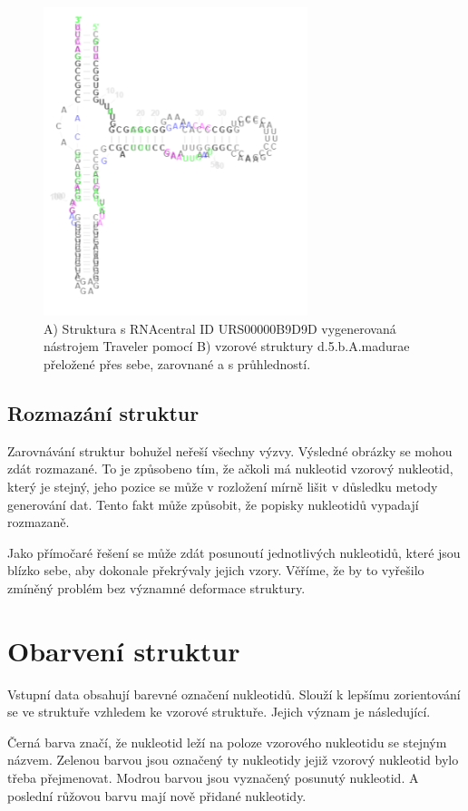 \begin{figure}[H]
  \centering
  \includegraphics[height=90mm]{../img/kap02/align/aligned.png}
  \caption{A) Struktura s RNAcentral ID URS00000B9D9D vygenerovaná nástrojem
  Traveler pomocí B) vzorové struktury d.5.b.A.madurae přeložené přes sebe,
  zarovnané a s průhledností.}
\end{figure}

\subsection{Rozmazání struktur}

Zarovnávání struktur bohužel neřeší všechny výzvy. Výsledné obrázky se mohou
zdát rozmazané. To je způsobeno tím, že ačkoli má nukleotid vzorový nukleotid,
který je stejný, jeho pozice se může v rozložení mírně lišit v důsledku metody
generování dat. Tento fakt může způsobit, že popisky nukleotidů vypadají
rozmazaně.

Jako přímočaré řešení se může zdát posunoutí jednotlivých nukleotidů, které jsou
blízko sebe, aby dokonale překrývaly jejich vzory. Věříme, že by to vyřešilo
zmíněný problém bez významné deformace struktury.

\section{Obarvení struktur}

Vstupní data obsahují barevné označení nukleotidů. Slouží k lepšímu
zorientování se ve struktuře vzhledem ke vzorové struktuře. Jejich význam je
následující.

Černá barva značí, že nukleotid leží na poloze vzorového nukleotidu se stejným
názvem. Zelenou barvou jsou označený ty nukleotidy jejiž vzorový nukleotid bylo
třeba přejmenovat. Modrou barvou jsou vyznačený posunutý nukleotid. A poslední
růžovou barvu mají nově přidané nukleotidy.

